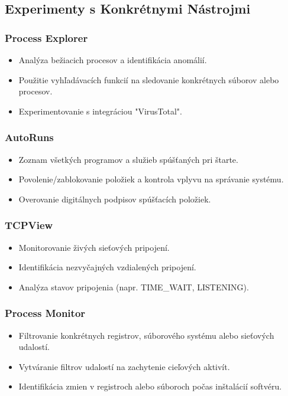 \documentclass[conference]{IEEEtran}
\begin{document}
\subsection{Experimenty s Konkrétnymi Nástrojmi}
\subsubsection{Process Explorer}
\begin{itemize}
    \item Analýza bežiacich procesov a identifikácia anomálií.
    \item Použitie vyhľadávacích funkcií na sledovanie konkrétnych súborov alebo procesov.
    \item Experimentovanie s integráciou "VirusTotal".
\end{itemize}

\subsubsection{AutoRuns}
\begin{itemize}
    \item Zoznam všetkých programov a služieb spúšťaných pri štarte.
    \item Povolenie/zablokovanie položiek a kontrola vplyvu na správanie systému.
    \item Overovanie digitálnych podpisov spúšťacích položiek.
\end{itemize}

\subsubsection{TCPView}
\begin{itemize}
    \item Monitorovanie živých sieťových pripojení.
    \item Identifikácia nezvyčajných vzdialených pripojení.
    \item Analýza stavov pripojenia (napr. TIME\_WAIT, LISTENING).
\end{itemize}

\subsubsection{Process Monitor}
\begin{itemize}
    \item Filtrovanie konkrétnych registrov, súborového systému alebo sieťových udalostí.
    \item Vytváranie filtrov udalostí na zachytenie cieľových aktivít.
    \item Identifikácia zmien v registroch alebo súboroch počas inštalácií softvéru.
\end{itemize}
\end{document}
